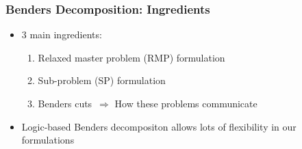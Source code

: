 \documentclass{beamer}
\begin{document}


\begin{frame}
\frametitle{Benders Decomposition: Ingredients}
\begin{itemize}
	\item 3 main ingredients:\vspace{2mm}\pause
	\begin{enumerate}
		\item Relaxed master problem (RMP) formulation \vspace{2mm}\pause
		\item Sub-problem (SP) formulation \vspace{2mm}\pause
		\item Benders cuts~$\Rightarrow$ How these problems communicate\vspace{3mm}\pause
	\end{enumerate}
	\item Logic-based Benders decompositon allows lots of flexibility in our formulations
\end{itemize}
\end{frame}
\end{document}
